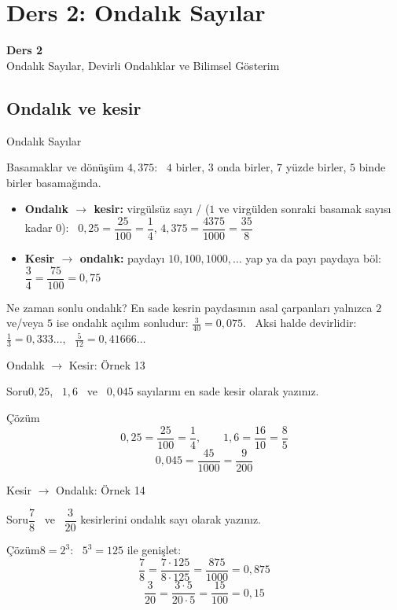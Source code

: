 \documentclass[aspectratio=169,11pt,handout]{beamer}
\newcommand{\soru}[3]{%
\begin{frame}{#1}
  \begin{block}{Soru}\large #2\end{block}
  \pause
  \begin{exampleblock}{Çözüm}\large #3\end{exampleblock}
\end{frame}}
\begin{document}
\section{Ders 2: Ondalık Sayılar}
\begin{frame}
\centering\Large\color{anamavi}\textbf{Ders 2}\\[6pt]\normalsize Ondalık Sayılar, Devirli Ondalıklar ve Bilimsel Gösterim
\end{frame}

\subsection{Ondalık ve kesir}
\begin{frame}{Ondalık Sayılar}
\begin{block}{Basamaklar ve dönüşüm}
\(4{,}375\): \ \(4\) birler, \(3\) onda birler, \(7\) yüzde birler, \(5\) binde birler basamağında.
\begin{itemize}
\item \textbf{Ondalık \(\to\) kesir:} virgülsüz sayı / (\(1\) ve virgülden sonraki basamak sayısı kadar \(0\)):
\ \(0{,}25=\dfrac{25}{100}=\dfrac{1}{4}\), \quad \(4{,}375=\dfrac{4375}{1000}=\dfrac{35}{8}\)
\item \textbf{Kesir \(\to\) ondalık:} paydayı \(10,100,1000,\dots\) yap ya da payı paydaya böl: \ \(\dfrac{3}{4}=\dfrac{75}{100}=0{,}75\)
\end{itemize}
\end{block}
\begin{alertblock}{Ne zaman sonlu ondalık?}
En sade kesrin paydasının asal çarpanları yalnızca \(2\) ve/veya \(5\) ise ondalık açılım sonludur:
\(\frac{3}{40}=0{,}075\). \ Aksi halde devirlidir: \(\frac{1}{3}=0{,}333\ldots\), \ \(\frac{5}{12}=0{,}41666\ldots\)
\end{alertblock}
\end{frame}

\soru{Ondalık \(\to\) Kesir: Örnek 13}
{\(0{,}25\), \ \(1{,}6\) \ ve \ \(0{,}045\) sayılarını en sade kesir olarak yazınız.}
{\[0{,}25=\frac{25}{100}=\frac{1}{4},\qquad 1{,}6=\frac{16}{10}=\frac{8}{5}\]
\[0{,}045=\frac{45}{1000}=\frac{9}{200}\]}

\soru{Kesir \(\to\) Ondalık: Örnek 14}
{\(\dfrac{7}{8}\) \ ve \ \(\dfrac{3}{20}\) kesirlerini ondalık sayı olarak yazınız.}
{\(8=2^3\): \ \(5^3=125\) ile genişlet:
\[\frac{7}{8}=\frac{7\cdot 125}{8\cdot 125}=\frac{875}{1000}=0{,}875\]
\[\frac{3}{20}=\frac{3\cdot 5}{20\cdot 5}=\frac{15}{100}=0{,}15\]}
\end{document}
